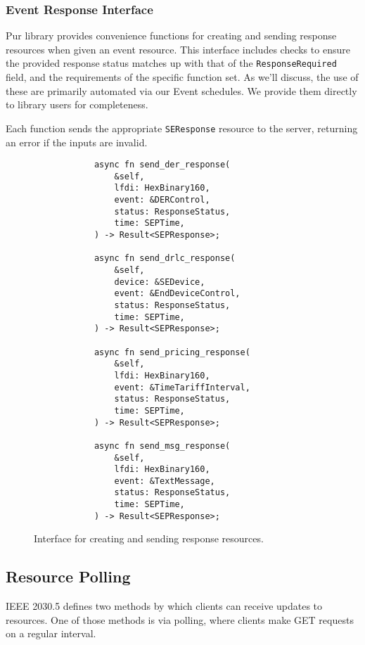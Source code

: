 \subsubsection{Event Response Interface}

Pur library provides convenience functions for creating and sending response resources when given an event resource. This interface includes checks to ensure the provided response status matches up with that of the \texttt{ResponseRequired} field, and the requirements of the specific function set.  As we'll discuss, the use of these are primarily automated via our Event schedules. We provide them directly to library users for completeness.

Each function sends the appropriate \texttt{SEResponse} resource to the server, returning an error if the inputs are invalid.


\begin{figure}[h]
    \begin{center}
        \begin{lstlisting}
            async fn send_der_response(
                &self,
                lfdi: HexBinary160,
                event: &DERControl,
                status: ResponseStatus,
                time: SEPTime,
            ) -> Result<SEPResponse>;

            async fn send_drlc_response(
                &self,
                device: &SEDevice,
                event: &EndDeviceControl,
                status: ResponseStatus,
                time: SEPTime,
            ) -> Result<SEPResponse>;

            async fn send_pricing_response(
                &self,
                lfdi: HexBinary160,
                event: &TimeTariffInterval,
                status: ResponseStatus,
                time: SEPTime,
            ) -> Result<SEPResponse>;

            async fn send_msg_response(
                &self,
                lfdi: HexBinary160,
                event: &TextMessage,
                status: ResponseStatus,
                time: SEPTime,
            ) -> Result<SEPResponse>;
        \end{lstlisting}
        \label{fig:sendresponsefunc}
        \vspace{-10pt}
        \caption{Interface for creating and sending response resources.}
    \end{center}
\end{figure}

\subsection{Resource Polling}
IEEE 2030.5 defines two methods by which clients can receive updates to resources. One of those methods is via polling, where clients make GET requests on a regular interval.

